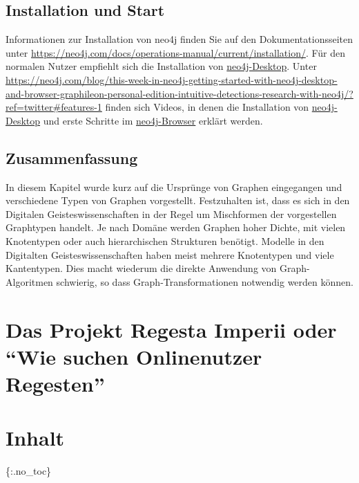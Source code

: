 \documentclass[ngerman,]{scrreprt}
\begin{document}
\section{Installation und Start}\label{installation-und-start}

Informationen zur Installation von neo4j finden Sie auf den Dokumentationsseiten unter \url{https://neo4j.com/docs/operations-manual/current/installation/}. Für den normalen Nutzer empfiehlt sich die Installation von \href{https://neo4j.com/download/}{neo4j-Desktop}. Unter \url{https://neo4j.com/blog/this-week-in-neo4j-getting-started-with-neo4j-desktop-and-browser-graphileon-personal-edition-intuitive-detections-research-with-neo4j/?ref=twitter\#features-1} finden sich Videos, in denen die Installation von \href{https://www.youtube.com/watch?v=8yWhuUnPapw}{neo4j-Desktop} und erste Schritte im \href{https://www.youtube.com/watch?v=rQTximyaETA}{neo4j-Browser} erklärt werden.

\section{Zusammenfassung}\label{zusammenfassung}

In diesem Kapitel wurde kurz auf die Ursprünge von Graphen eingegangen und verschiedene Typen von Graphen vorgestellt. Festzuhalten ist, dass es sich in den Digitalen Geisteswissenschaften in der Regel um Mischformen der vorgestellen Graphtypen handelt. Je nach Domäne werden Graphen hoher Dichte, mit vielen Knotentypen oder auch hierarchischen Strukturen benötigt. Modelle in den Digitalten Geisteswissenschaften haben meist mehrere Knotentypen und viele Kantentypen. Dies macht wiederum die direkte Anwendung von Graph-Algoritmen schwierig, so dass Graph-Transformationen notwendig werden können.

\chapter{\texorpdfstring{Das Projekt Regesta Imperii oder ``Wie suchen Onlinenutzer Regesten''}{Das Projekt Regesta Imperii oder Wie suchen Onlinenutzer Regesten}}\label{das-projekt-regesta-imperii-oder-wie-suchen-onlinenutzer-regesten}

\chapter{Inhalt}\label{inhalt-2}

\{:.no\_toc\}
\end{document}
